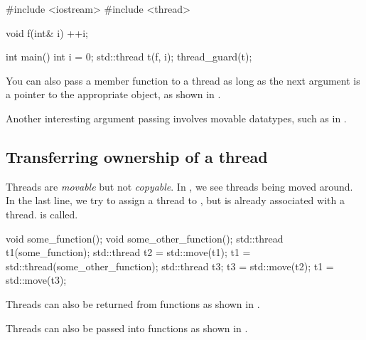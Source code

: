 \begin{CPP}[label=list:multiple-args-bad-ref,caption=Failing to pass a reference to a thread]
#include <iostream>
#include <thread>

void f(int& i) {
    ++i;
}

int main() {
    int i = 0;
    std::thread t(f, i);
    thread_guard(t);
}
\end{CPP}


You can also pass a member function to a thread as long as the next argument is a pointer to the appropriate object, as shown in .


Another interesting argument passing involves movable datatypes, such as in .


\subsection{Transferring ownership of a thread}
Threads are \emph{movable} but not \emph{copyable}. In , we see threads being moved around. In the last line, we try to assign a thread to , but  is already associated with a thread.  is called.

\begin{CPP}[label=list:moveable-copyable,caption=Moving Threads]
void some_function();
void some_other_function();
std::thread t1(some_function);
std::thread t2 = std::move(t1);
t1 = std::thread(some_other_function);
std::thread t3;
t3 = std::move(t2);
t1 = std::move(t3);
\end{CPP}

Threads can also be returned from functions as shown in .


Threads can also be passed into functions as shown in .


